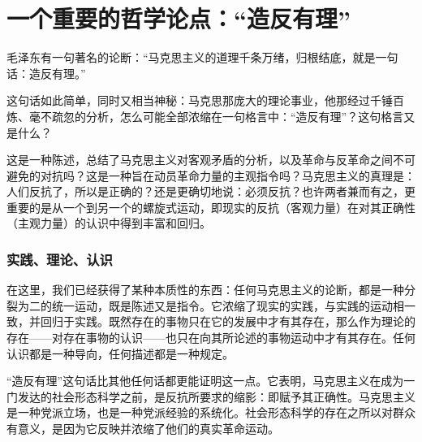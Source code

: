 \documentclass[fontset=fandol, a4paper, 12pt, twoside]{ctexart}
\renewenvironment{quote}
  {\list{}{\rightmargin=0cm \leftmargin=2em}%
   \item\relax\small\kaishu\color{black}}
  {\endlist}
\begin{document}
    


\setcounter{page}{1}

\section{一个重要的哲学论点：“造反有理”}

毛泽东有一句著名的论断：“马克思主义的道理千条万绪，归根结底，就是一句话：造反有理。”

这句话如此简单，同时又相当神秘：马克思那庞大的理论事业，他那经过千锤百炼、毫不疏忽的分析，怎么可能全部浓缩在一句格言中：“造反有理”？这句格言又是什么？

这是一种陈述，总结了马克思主义对客观矛盾的分析，以及革命与反革命之间不可避免的对抗吗？这是一种旨在动员革命力量的主观指令吗？马克思主义的真理是：人们反抗了，所以是正确的？还是更确切地说：必须反抗？也许两者兼而有之，更重要的是从一个到另一个的螺旋式运动，即现实的反抗（客观力量）在对其正确性（主观力量）的认识中得到丰富和回归。

\subsubsection*{实践、理论、认识}

在这里，我们已经获得了某种本质性的东西：任何马克思主义的论断，都是一种分裂为二的统一运动，既是陈述又是指令。它浓缩了现实的实践，与实践的运动相一致，并回归于实践。既然存在的事物只在它的发展中才有其存在，那么作为理论的存在——对存在事物的认识——也只在向其所论述的事物运动中才有其存在。任何认识都是一种导向，任何描述都是一种规定。

“造反有理”这句话比其他任何话都更能证明这一点。它表明，马克思主义在成为一门发达的社会形态科学之前，是反抗所要求的缩影：即赋予其正确性。马克思主义是一种党派立场，也是一种党派经验的系统化。社会形态科学的存在之所以对群众有意义，是因为它反映并浓缩了他们的真实革命运动。
\end{document}
